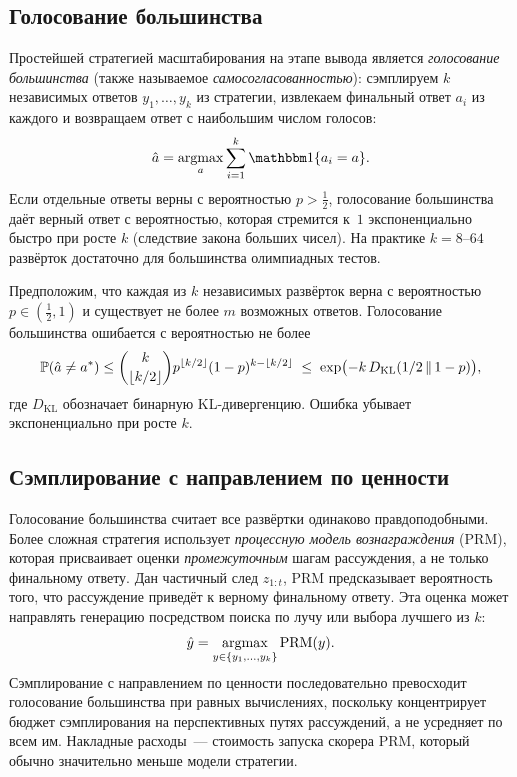 \subsection{Голосование большинства}
\label{subsec:majority-voting}

Простейшей стратегией масштабирования на этапе вывода является \emph{голосование
большинства} (также называемое \emph{самосогласованностью}):
сэмплируем $k$ независимых ответов $y_1, \ldots, y_k$ из стратегии,
извлекаем финальный ответ $a_i$ из каждого и возвращаем ответ с наибольшим числом голосов:
\begin{equation}
\label{eq:majority-vote}
\hat{a} = \argmax_{a} \sum_{i=1}^{k} \ind\{a_i = a\}.
\end{equation}
Если отдельные ответы верны с вероятностью $p >
\frac{1}{2}$, голосование большинства даёт верный ответ с вероятностью, которая
стремится к~$1$ экспоненциально быстро при росте $k$ (следствие
закона больших чисел). На практике $k = 8$--$64$ развёрток
достаточно для большинства олимпиадных тестов.

\begin{proposition}
\label{prop:majority-vote}
Предположим, что каждая из $k$ независимых развёрток верна с вероятностью
$p \in (\frac{1}{2}, 1)$ и существует не более $m$ возможных ответов.
Голосование большинства ошибается с вероятностью не более
\[
\mathbb{P}(\hat{a} \ne a^*) \le
\binom{k}{\lfloor k/2 \rfloor} p^{\lfloor k/2 \rfloor}(1-p)^{k - \lfloor k/2 \rfloor}
\;\le\; \exp\bigl(-k\,D_{\mathrm{KL}}(1/2 \,\|\, 1-p)\bigr),
\]
где $D_{\mathrm{KL}}$ обозначает бинарную KL-дивергенцию. Ошибка
убывает экспоненциально при росте $k$.
\end{proposition}

\subsection{Сэмплирование с направлением по ценности}
\label{subsec:value-guided}

Голосование большинства считает все развёртки одинаково правдоподобными. Более
сложная стратегия использует \emph{процессную модель вознаграждения}
(PRM), которая присваивает оценки
\emph{промежуточным} шагам рассуждения, а не только финальному ответу.
Дан частичный след $z_{1:t}$, PRM предсказывает вероятность
того, что рассуждение приведёт к верному финальному ответу. Эта оценка
может направлять генерацию посредством поиска по лучу или выбора лучшего из $k$:
\begin{equation}
\label{eq:prm-selection}
\hat{y} = \operatorname*{argmax}_{y \in \{y_1,\ldots,y_k\}} \mathrm{PRM}(y).
\end{equation}
Сэмплирование с направлением по ценности последовательно превосходит голосование большинства при равных
вычислениях, поскольку концентрирует бюджет сэмплирования на перспективных путях
рассуждений, а не усредняет по всем им. Накладные расходы~--- стоимость
запуска скорера PRM, который обычно значительно меньше модели
стратегии.

